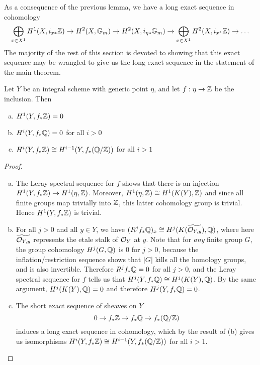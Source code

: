 As a consequence of the previous lemma, we have a long exact sequence in cohomology
\begin{equation}\label{les form1}
\bigoplus_{x\in X^1}H^1(X, i_{x*}\mathbb{Z}) \rightarrow H^2(X,\mathbb{G}_m)\rightarrow H^2(X,i_{\eta*}\mathbb{G}_m)\rightarrow \bigoplus_{x\in X^1}H^2(X, i_{x^*}\mathbb{Z})\rightarrow \dots
\end{equation}
The majority of the rest of this section is devoted to showing that this exact sequence may be wrangled to give us the long exact sequence in the statement of the main theorem.
\begin{lem}
Let $Y$ be an integral scheme with generic point $\eta$, and let $f: \eta\rightarrow\mathbb{Z}$ be the inclusion.  Then
\begin{enumerate}[(a)]
\item  $H^1(Y,f_*\mathbb{Z}) =0$
\item  $H^i(Y,f_*\mathbb{Q}) =0$ for all $i>0$
\item  $H^i(Y,f_*\mathbb{Z})\cong H^{i-1}(Y,f_*(\mathbb{Q}/\mathbb{Z}))$ for all $i>1$
\end{enumerate}
\end{lem}
\begin{proof}\mbox{}
\begin{enumerate}[(a)]
\item  The Leray spectral sequence for $f$ shows that there is an injection $H^1(Y,f_*\mathbb{Z})\rightarrow H^1(\eta,\mathbb{Z})$.  Moreover, $H^1(\eta,\mathbb{Z})\cong H^1(K(Y),\mathbb{Z})$ and since all finite groups map trivially into $\mathbb{Z}$, this latter cohomology group is trivial.  Hence $H^1(Y,f_*\mathbb{Z})$ is trivial.
\item  For all $j>0$ and all $y\in Y$, we have $(R^jf_*\mathbb{Q})_x \cong H^j(K(\widetilde{\mathcal{O}_{Y,y}}),\mathbb{Q})$, where here $\widetilde{\mathcal{O}_{Y,y}}$ represents the etale stalk of $\mathcal{O}_Y$ at $y$.  Note that for \emph{any} finite group $G$, the group cohomology $H^j(G,\mathbb{Q})$ is $0$ for $j>0$, because the inflation/restriction sequence shows that $|G|$ kills all the homology groups, and is also invertible.  Therefore $R^jf_*\mathbb{Q} = 0$ for all $j>0$, and the Leray spectral sequence for $f$ tells us that $H^j(Y,f_*\mathbb{Q})\cong H^j(K(Y),\mathbb{Q})$.  By the same argument, $H^j(K(Y),\mathbb{Q}) = 0$ and therefore $H^j(Y,f_*\mathbb{Q}) = 0$.
\item  The short exact sequence of sheaves on $Y$
$$0\rightarrow f_*\mathbb{Z}\rightarrow f_*\mathbb{Q}\rightarrow f_*(\mathbb{Q}/\mathbb{Z})$$
induces a long exact sequence in cohomology, which by the result of (b) gives us isomorphisms $H^i(Y,f_*\mathbb{Z})\cong H^{i-1}(Y,f_*(\mathbb{Q}/\mathbb{Z}))$ for all $i>1$.
\end{enumerate}
\end{proof}

